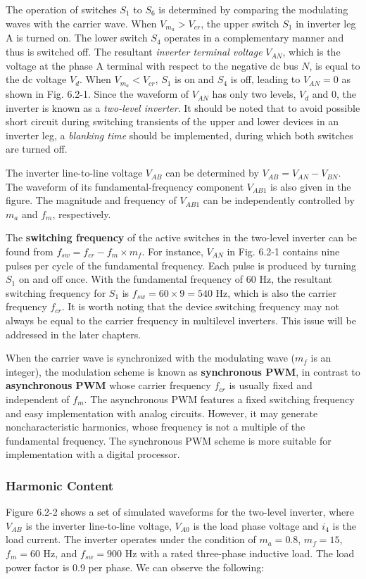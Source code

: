 \documentclass[letterpaper,12pt]{article}
\begin{document}
The operation of switches $S_1$ to $S_6$ is determined by comparing the modulating waves with the carrier wave. When $V_{m_a} > V_{cr}$, the upper switch $S_1$ in inverter leg A is turned on. The lower switch $S_4$ operates in a complementary manner and thus is switched off. The resultant \textit{inverter terminal voltage} $V_{AN}$, which is the voltage at the phase A terminal with respect to the negative dc bus $N$, is equal to the dc voltage $V_d$. When $V_{m_a} < V_{cr}$, $S_1$ is on and $S_4$ is off, leading to $V_{AN} = 0$ as shown in Fig. 6.2-1. Since the waveform of $V_{AN}$ has only two levels, $V_d$ and 0, the inverter is known as a \textit{two-level inverter}. It should be noted that to avoid possible short circuit during switching transients of the upper and lower devices in an inverter leg, a \textit{blanking time} should be implemented, during which both switches are turned off.

The inverter line-to-line voltage $V_{AB}$ can be determined by $V_{AB} = V_{AN} - V_{BN}$. The waveform of its fundamental-frequency component $V_{AB1}$ is also given in the figure. The magnitude and frequency of $V_{AB1}$ can be independently controlled by $m_a$ and $f_m$, respectively.

The \textbf{switching frequency} of the active switches in the two-level inverter can be found from $f_{sw} = f_{cr} - f_m \times m_f$. For instance, $V_{AN}$ in Fig. 6.2-1 contains nine pulses per cycle of the fundamental frequency. Each pulse is produced by turning $S_1$ on and off once. With the fundamental frequency of 60 Hz, the resultant switching frequency for $S_1$ is $f_{sw} = 60 \times 9 = 540$ Hz, which is also the carrier frequency $f_{cr}$. It is worth noting that the device switching frequency may not always be equal to the carrier frequency in multilevel inverters. This issue will be addressed in the later chapters.

When the carrier wave is synchronized with the modulating wave ($m_f$ is an integer), the modulation scheme is known as \textbf{synchronous PWM}, in contrast to \textbf{asynchronous PWM} whose carrier frequency $f_{cr}$ is usually fixed and independent of $f_m$. The asynchronous PWM features a fixed switching frequency and easy implementation with analog circuits. However, it may generate noncharacteristic harmonics, whose frequency is not a multiple of the fundamental frequency. The synchronous PWM scheme is more suitable for implementation with a digital processor.

\subsubsection{Harmonic Content}
Figure 6.2-2 shows a set of simulated waveforms for the two-level inverter, where $V_{AB}$ is the inverter line-to-line voltage, $V_{A0}$ is the load phase voltage and $i_4$ is the load current. The inverter operates under the condition of $m_a = 0.8$, $m_f = 15$, $f_m = 60$ Hz, and $f_{sw} = 900$ Hz with a rated three-phase inductive load. The load power factor is 0.9 per phase. We can observe the following:
\end{document}
